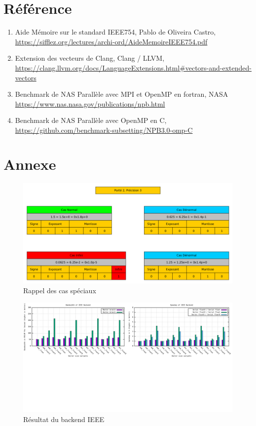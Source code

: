 \documentclass[12pt, letterpaper]{article}
\begin{document}
\section{Référence}
\label{sec:org4285de9}

\begin{enumerate}
\item \label{org6ad9228} Aide Mémoire sur le standard IEEE754, Pablo de Oliveira Castro,
\url{https://sifflez.org/lectures/archi-ord/AideMemoireIEEE754.pdf}
\item \label{org1ac5fef} Extension des vecteurs de Clang, Clang / LLVM,
\url{https://clang.llvm.org/docs/LanguageExtensions.html\#vectors-and-extended-vectors}
\item Benchmark de NAS Parallèle avec MPI et OpenMP en fortran, NASA
\url{https://www.nas.nasa.gov/publications/npb.html}
\item Benchmark de NAS Parallèle avec OpenMP en C,
\url{https://github.com/benchmark-subsetting/NPB3.0-omp-C}
\end{enumerate}

\section{Annexe}
\label{sec:orgcc7abc5}

\label{org9d96a0f}
\begin{figure}[htbp]
\centering
\includegraphics[width=450px]{../ressources/special_case.png}
\caption{\label{fig:orga7efb98}Rappel des cas spéciaux}
\end{figure}

\label{org0ee5c8f}
\begin{figure}[htbp]
\centering
\includegraphics[width=450px]{../ressources/vm_ieee.png}
\caption{\label{fig:orgb6e8b46}Résultat du backend IEEE}
\end{figure}
\end{document}
